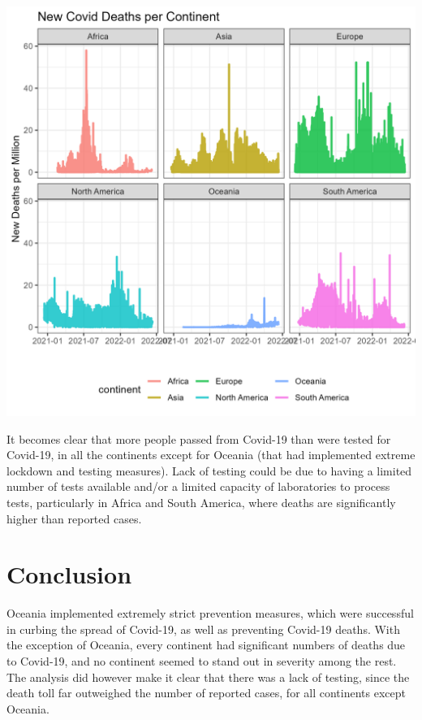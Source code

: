 \documentclass[11pt,preprint, authoryear]{elsarticle}
\numberwithin{equation}{section}
\numberwithin{figure}{section}
\numberwithin{table}{section}
\begin{document}
\includegraphics{Figures/Figure3.png} \hfill

It becomes clear that more people passed from Covid-19 than were tested
for Covid-19, in all the continents except for Oceania (that had
implemented extreme lockdown and testing measures). Lack of testing
could be due to having a limited number of tests available and/or a
limited capacity of laboratories to process tests, particularly in
Africa and South America, where deaths are significantly higher than
reported cases.

\hypertarget{conclusion}{%
\section*{Conclusion}\label{conclusion}}

Oceania implemented extremely strict prevention measures, which were
successful in curbing the spread of Covid-19, as well as preventing
Covid-19 deaths. With the exception of Oceania, every continent had
significant numbers of deaths due to Covid-19, and no continent seemed
to stand out in severity among the rest. The analysis did however make
it clear that there was a lack of testing, since the death toll far
outweighed the number of reported cases, for all continents except
Oceania.


\end{document}
